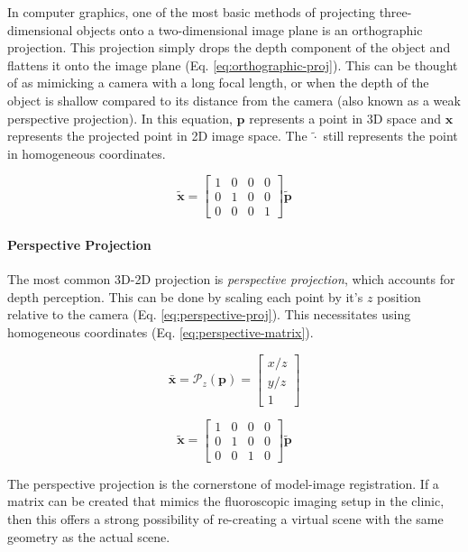 In computer graphics, one of the most basic methods of projecting three-dimensional objects onto a two-dimensional image plane is an orthographic projection. This projection simply drops the depth component of the object and flattens it onto the image plane (Eq. \ref{eq:orthographic-proj}). This can be thought of as mimicking a camera with a long focal length, or when the depth of the object is shallow compared to its distance from the camera (also known as a weak perspective projection). In this equation, $\mathbf{p}$ represents a point in 3D space and $\mathbf{x}$ represents the projected point in 2D image space. The $\tilde{\cdot}$ still represents the point in homogeneous coordinates.

\begin{equation}
    \tilde{\mathbf{x}} = \begin{bmatrix}
        1 & 0 & 0 & 0 \\ 0 & 1 & 0 & 0 \\ 0 & 0 & 0 & 1
    \end{bmatrix}\tilde{\mathbf{p}}
    \label{eq:orthographic-proj}
\end{equation}

\paragraph*{Perspective Projection} 
The most common 3D-2D projection is \emph{perspective projection}, which accounts for depth perception. This can be done by scaling each point by it's $z$ position relative to the camera (Eq. \ref{eq:perspective-proj}). This necessitates using homogeneous coordinates (Eq. \ref{eq:perspective-matrix}).

\begin{equation}
    \bar{\mathbf{x}} = \mathcal{P}_z(\mathbf{p}) = \begin{bmatrix}
        x/z \\ y/z \\ 1
    \end{bmatrix}
    \label{eq:perspective-proj}
\end{equation}

\begin{equation}
    \tilde{\mathbf{x}} = \begin{bmatrix}
        1 & 0 & 0 & 0 \\ 0 & 1 & 0 & 0 \\ 0 & 0 & 1 & 0 
    \end{bmatrix}\tilde{\mathbf{p}}
    \label{eq:perspective-matrix}
\end{equation}

The perspective projection is the cornerstone of model-image registration. If a matrix can be created that mimics the fluoroscopic imaging setup in the clinic, then this offers a strong possibility of re-creating a virtual scene with the same geometry as the actual scene.

